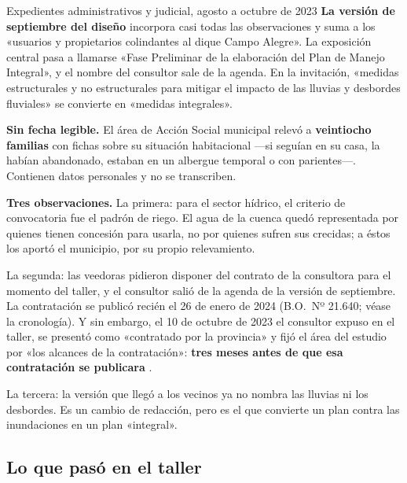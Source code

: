 \begin{ficha}{Expedientes administrativos y judicial, agosto a octubre de 2023}
\textbf{La versión de septiembre del diseño} incorpora casi todas las observaciones y suma a los «usuarios y propietarios colindantes al dique Campo Alegre». La exposición central pasa a llamarse «Fase Preliminar de la elaboración del Plan de Manejo Integral», y el nombre del consultor sale de la agenda. En la invitación, «medidas estructurales y no estructurales para mitigar el impacto de las lluvias y desbordes fluviales» se convierte en «medidas integrales».

\textbf{Sin fecha legible.} El área de Acción Social municipal relevó a \textbf{veintiocho familias} con fichas sobre su situación habitacional ---si seguían en su casa, la habían abandonado, estaban en un albergue temporal o con parientes---. Contienen datos personales y no se transcriben.
\end{ficha}

\begin{cautela}
\textbf{Tres observaciones.} La primera: para el sector hídrico, el criterio de convocatoria fue el padrón de riego. El agua de la cuenca quedó representada por quienes tienen concesión para usarla, no por quienes sufren sus crecidas; a éstos los aportó el municipio, por su propio relevamiento.

La segunda: las veedoras pidieron disponer del contrato de la consultora para el momento del taller, y el consultor salió de la agenda de la versión de septiembre. La contratación se publicó recién el 26 de enero de 2024 (B.O.\ Nº 21.640; véase la cronología). Y sin embargo, el 10 de octubre de 2023 el consultor expuso en el taller, se presentó como «contratado por la provincia» y fijó el área del estudio por «los alcances de la contratación»: \textbf{tres meses antes de que esa contratación se publicara} .

La tercera: la versión que llegó a los vecinos ya no nombra las lluvias ni los desbordes. Es un cambio de redacción, pero es el que convierte un plan contra las inundaciones en un plan «integral».
\end{cautela}

\subsection*{Lo que pasó en el taller}

